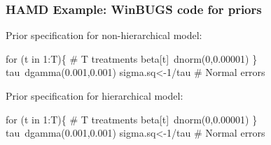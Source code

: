 \documentclass{beamer}
\begin{document}
\begin{frame}[containsverbatim]
    \frametitle{HAMD Example: WinBUGS code for priors}
    \vspace{2mm} Prior specification for non-hierarchical model:
    \footnotesize
    \begin{ColorVerbatim}
\color{red}{alpha~dnorm(0,0.00001)}		
for (t in 1:T)\{  # T treatments	
  beta[t]~dnorm(0,0.00001)
  \}						
tau~dgamma(0.001,0.001)
sigma.sq<-1/tau  # Normal errors		
    \end{ColorVerbatim}
    \vspace{1mm} \normalsize Prior specification for hierarchical model:
    \footnotesize
    \begin{ColorVerbatim}
\color{red}{alpha.mu~dnorm(0,0.00001)}
\color{red}{alpha.sigma~dunif(0,100) }
\color{red}{alpha.sigma.sq<-pow(alpha.sigma,2)}
\color{red}{alpha.tau<-1/alpha.sigma.sq}
for (t in 1:T)\{  # T treatments	
  beta[t]~dnorm(0,0.00001)
  \}								
tau~dgamma(0.001,0.001)
sigma.sq<-1/tau  # Normal errors	
    \end{ColorVerbatim}
\end{frame}
\end{document}
